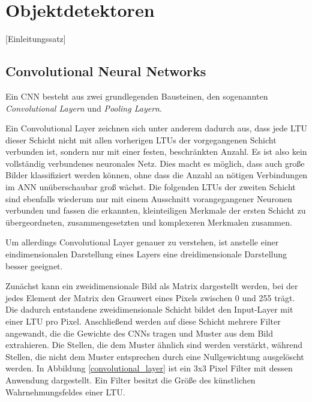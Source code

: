 \section{Objektdetektoren}

[Einleitungssatz]

\subsection{Convolutional Neural Networks}

Ein CNN besteht aus zwei grundlegenden Bausteinen, den sogenannten \textit{Convolutional Layern} und \textit{Pooling Layern}.

Ein Convolutional Layer zeichnen sich unter anderem dadurch aus, dass jede LTU dieser Schicht nicht mit allen vorherigen LTUs der vorgegangenen Schicht verbunden ist, sondern nur mit einer festen, beschränkten Anzahl. Es ist also kein vollständig verbundenes neuronales Netz. Dies macht es möglich, dass auch große Bilder klassifiziert werden können, ohne dass die Anzahl an nötigen Verbindungen im ANN unüberschaubar groß wächst. Die folgenden LTUs der zweiten Schicht sind ebenfalls wiederum nur mit einem Ausschnitt vorangegangener Neuronen verbunden und fassen die erkannten, kleinteiligen Merkmale der ersten Schicht zu übergeordneten, zusammengesetzten und komplexeren Merkmalen zusammen. \cite{AurelienGeron.2018}

Um allerdings Convolutional Layer genauer zu verstehen, ist anstelle einer eindimensionalen Darstellung eines Layers eine dreidimensionale Darstellung besser geeignet.

Zunächst kann ein zweidimensionale Bild als Matrix dargestellt werden, bei der jedes Element der Matrix den Grauwert eines Pixels zwischen 0 und 255 trägt. Die dadurch entstandene zweidimensionale Schicht bildet den Input-Layer mit einer LTU pro Pixel. Anschließend werden auf diese Schicht mehrere Filter angewandt, die die Gewichte des CNNs tragen und Muster aus dem Bild extrahieren. Die Stellen, die dem Muster ähnlich sind werden verstärkt, während Stellen, die nicht dem Muster entsprechen durch eine Nullgewichtung ausgelöscht werden. In Abbildung \ref{convolutional_layer} ist ein 3x3 Pixel Filter mit dessen Anwendung dargestellt. Ein Filter besitzt die Größe des künstlichen Wahrnehmungsfeldes einer LTU. \cite{AurelienGeron.2018}

